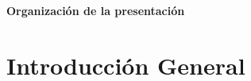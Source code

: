 \documentclass[aspectratio=43, handout]{beamer}
\begin{document}

\begin{frame}{\textbf{\LARGE{Organización de la presentación}}}
\fontsize{13pt}{13}\selectfont
  \tableofcontents
\end{frame}
%
%

\section{Introducción General}
\end{document}
